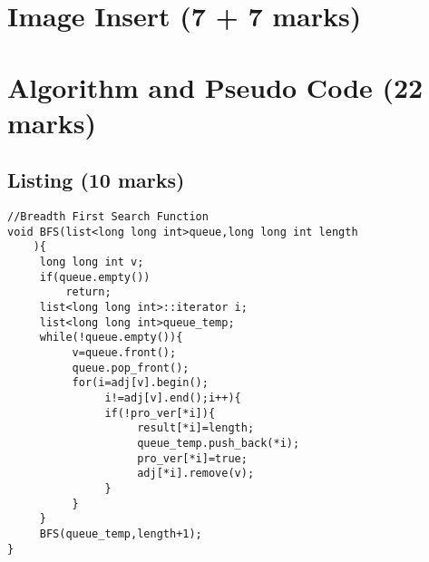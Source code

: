 \documentclass[a4paper,11pt]{article}
\begin{document}
\section{\textbf{Image Insert (7 + 7 marks)}}
\pagebreak
\section{\textbf{Algorithm and Pseudo Code (22 marks)}}
\subsection{\textbf{Listing (10 marks)}}
\begin{lstlisting}
//Breadth First Search Function
void BFS(list<long long int>queue,long long int length
    ){
     long long int v;
     if(queue.empty())
         return; 
     list<long long int>::iterator i;
     list<long long int>queue_temp;
     while(!queue.empty()){
          v=queue.front();
          queue.pop_front();
          for(i=adj[v].begin();
               i!=adj[v].end();i++){
               if(!pro_ver[*i]){
                    result[*i]=length;
                    queue_temp.push_back(*i);
                    pro_ver[*i]=true;
                    adj[*i].remove(v);
               }
          }
     }
     BFS(queue_temp,length+1);
}
\end{lstlisting}
\pagebreak
\end{document}
